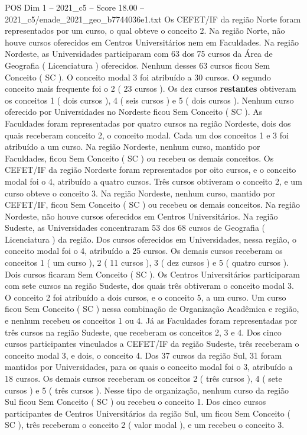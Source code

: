 \begin{textsample}{POS Dim 1 – 2021\_c5 – Score 18.00 – 2021\_c5/enade\_2021\_geo\_b7744036e1.txt}
Os CEFET/IF da região Norte foram representados por um curso, o qual obteve o conceito 2.
Na região Norte, não houve cursos oferecidos em Centros Universitários nem em Faculdades.
Na região Nordeste, as Universidades participaram com 63 dos 75 cursos da Área de Geografia ( Licenciatura ) oferecidos.
Nenhum desses 63 cursos ficou Sem Conceito ( SC ).
O conceito modal 3 foi atribuído a 30 cursos.
O segundo conceito mais frequente foi o 2 ( 23 cursos ).
Os dez cursos \textbf{restantes} obtiveram os conceitos 1 ( dois cursos ), 4 ( seis cursos ) e 5 ( dois cursos ).
Nenhum curso oferecido por Universidades no Nordeste ficou Sem Conceito ( SC ).
As Faculdades foram representadas por quatro cursos na região Nordeste, dois dos quais receberam conceito 2, o conceito modal.
Cada um dos conceitos 1 e 3 foi atribuído a um curso.
Na região Nordeste, nenhum curso, mantido por Faculdades, ficou Sem Conceito ( SC ) ou recebeu os demais conceitos.
Os CEFET/IF da região Nordeste foram representados por oito cursos, e o conceito modal foi o 4, atribuído a quatro cursos.
Três cursos obtiveram o conceito 2, e um curso obteve o conceito 3.
Na região Nordeste, nenhum curso, mantido por CEFET/IF, ficou Sem Conceito ( SC ) ou recebeu os demais conceitos.
Na região Nordeste, não houve cursos oferecidos em Centros Universitários.
Na região Sudeste, as Universidades concentraram 53 dos 68 cursos de Geografia ( Licenciatura ) da região.
Dos cursos oferecidos em Universidades, nessa região, o conceito modal foi o 4, atribuído a 25 cursos.
Os demais cursos receberam os conceitos 1 ( um curso ), 2 ( 11 cursos ), 3 ( dez cursos ) e 5 ( quatro cursos ).
Dois cursos ficaram Sem Conceito ( SC ).
Os Centros Universitários participaram com sete cursos na região Sudeste, dos quais três obtiveram o conceito modal 3.
O conceito 2 foi atribuído a dois cursos, e o conceito 5, a um curso.
Um curso ficou Sem Conceito ( SC ) nessa combinação de Organização Acadêmica e região, e nenhum recebeu os conceitos 1 ou 4.
Já as Faculdades foram representadas por três cursos na região Sudeste, que receberam os conceitos 2, 3 e 4.
Dos cinco cursos participantes vinculados a CEFET/IF da região Sudeste, três receberam o conceito modal 3, e dois, o conceito 4.
Dos 37 cursos da região Sul, 31 foram mantidos por Universidades, para os quais o conceito modal foi o 3, atribuído a 18 cursos.
Os demais cursos receberam os conceitos 2 ( três cursos ), 4 ( sete cursos ) e 5 ( três cursos ).
Nesse tipo de organização, nenhum curso da região Sul ficou Sem Conceito ( SC ) ou recebeu o conceito 1.
Dos cinco cursos participantes de Centros Universitários da região Sul, um ficou Sem Conceito ( SC ), três receberam o conceito 2 ( valor modal ), e um recebeu o conceito 3.

\end{textsample}
